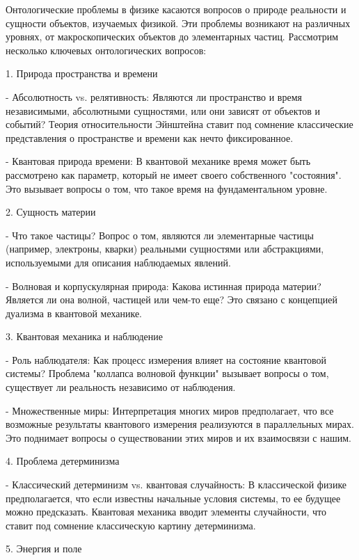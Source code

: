 \documentclass[exam_answers.tex]{subfiles}
\begin{document}
\renewcommand{\baselinestretch}{\blch}

Онтологические проблемы в физике касаются вопросов о природе реальности и сущности объектов, изучаемых физикой.
Эти проблемы возникают на различных уровнях, от макроскопических объектов до элементарных частиц. Рассмотрим несколько ключевых онтологических вопросов:

1. Природа пространства и времени

- Абсолютность vs. релятивность: Являются ли пространство и время независимыми, абсолютными сущностями, или они зависят от объектов и событий? Теория относительности Эйнштейна ставит под сомнение классические представления о пространстве и времени как нечто фиксированное.

- Квантовая природа времени: В квантовой механике время может быть рассмотрено как параметр, который не имеет своего собственного "состояния". Это вызывает вопросы о том, что такое время на фундаментальном уровне.

2. Сущность материи

- Что такое частицы? Вопрос о том, являются ли элементарные частицы (например, электроны, кварки) реальными сущностями или абстракциями, используемыми для описания наблюдаемых явлений.
 
- Волновая и корпускулярная природа: Какова истинная природа материи? Является ли она волной, частицей или чем-то еще? Это связано с концепцией дуализма в квантовой механике.

3. Квантовая механика и наблюдение

- Роль наблюдателя: Как процесс измерения влияет на состояние квантовой системы? Проблема "коллапса волновой функции" вызывает вопросы о том, существует ли реальность независимо от наблюдения.

- Множественные миры: Интерпретация многих миров предполагает, что все возможные результаты квантового измерения реализуются в параллельных мирах. Это поднимает вопросы о существовании этих миров и их взаимосвязи с нашим.

4. Проблема детерминизма

- Классический детерминизм vs. квантовая случайность: В классической физике предполагается, что если известны начальные условия системы, то ее будущее можно предсказать.
Квантовая механика вводит элементы случайности, что ставит под сомнение классическую картину детерминизма.

5. Энергия и поле
\end{document}
